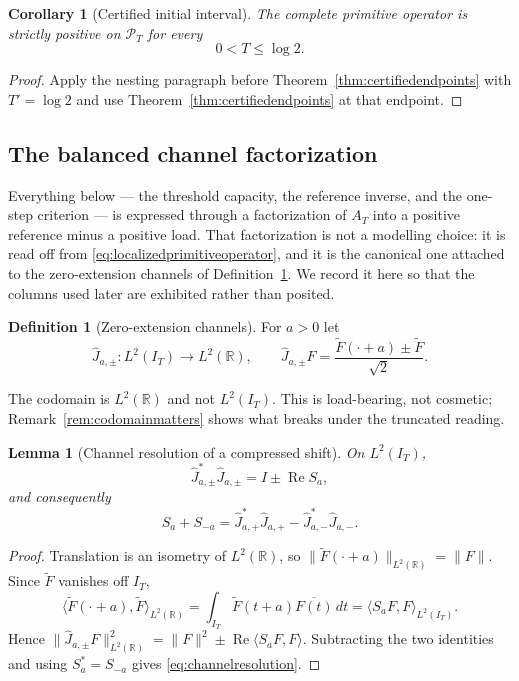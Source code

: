 \documentclass[11pt]{amsart}
\newtheorem{lemma}[theorem]{Lemma}
\newtheorem{corollary}[theorem]{Corollary}
\theoremstyle{definition}
\newtheorem{definition}[theorem]{Definition}
\theoremstyle{remark}
\newcommand{\R}{\mathbb R}
\begin{document}
\begin{corollary}[Certified initial interval]\label{cor:certifiedinitialinterval}
The complete primitive operator is strictly positive on \(\mathcal P_T\)
for every
\[
 0<T\le\log2.
\]
\end{corollary}

\begin{proof}
Apply the nesting paragraph before Theorem~\ref{thm:certifiedendpoints} with \(T'=\log2\) and use
Theorem~\ref{thm:certifiedendpoints} at that endpoint.
\end{proof}

\subsection{The balanced channel factorization}
\label{subsec:balancedchannel}

Everything below --- the threshold capacity, the reference inverse, and the
one-step criterion --- is expressed through a factorization of \(A_T\) into a
positive reference minus a positive load.  That factorization is not a
modelling choice: it is read off from \eqref{eq:localizedprimitiveoperator}, and it
is the canonical one attached to the zero-extension channels of
Definition~\ref{def:zeroextchannels}.  We record it here so that the columns used later are exhibited
rather than posited.

\begin{definition}[Zero-extension channels]\label{def:zeroextchannels}
For \(a>0\) let
\[
 \widehat J_{a,\pm}:L^2(I_T)\longrightarrow L^2(\R),
 \qquad
 \widehat J_{a,\pm}F=\frac{\widetilde F(\cdot+a)\pm\widetilde F}{\sqrt2}.
\]
\end{definition}

The codomain is \(L^2(\R)\) and not \(L^2(I_T)\).  This is load-bearing, not
cosmetic; Remark~\ref{rem:codomainmatters} shows what breaks under the
truncated reading.

\begin{lemma}[Channel resolution of a compressed shift]\label{lem:channelresolution}
On \(L^2(I_T)\),
\[
 \widehat J_{a,\pm}^*\widehat J_{a,\pm}=I\pm\operatorname{Re}S_a ,
\]
and consequently
\begin{equation}\label{eq:channelresolution}
 S_a+S_{-a}
 =\widehat J_{a,+}^*\widehat J_{a,+}-\widehat J_{a,-}^*\widehat J_{a,-}.
\end{equation}
\end{lemma}

\begin{proof}
Translation is an isometry of \(L^2(\R)\), so
\(\|\widetilde F(\cdot+a)\|_{L^2(\R)}=\|F\|\).  Since \(\widetilde F\)
vanishes off \(I_T\),
\[
 \langle\widetilde F(\cdot+a),\widetilde F\rangle_{L^2(\R)}
 =\int_{I_T}\widetilde F(t+a)\overline{F(t)}\,dt
 =\langle S_aF,F\rangle_{L^2(I_T)} .
\]
Hence
\(\|\widehat J_{a,\pm}F\|_{L^2(\R)}^2
 =\|F\|^2\pm\operatorname{Re}\langle S_aF,F\rangle\).
Subtracting the two identities and using \(S_a^*=S_{-a}\) gives
\eqref{eq:channelresolution}.
\end{proof}
\end{document}
